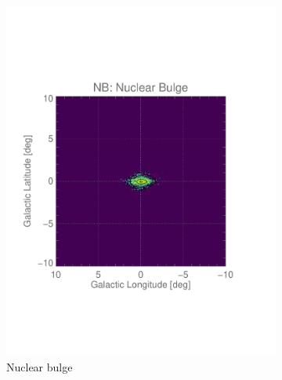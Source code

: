 \documentclass[doublespace,nopageskip]{VTthesis}
\begin{document}
\begin{figure}[htb]
\begin{subfigure}[h]{0.32\textwidth}
		\includegraphics[width=1\textwidth,trim=0.44in 2.03in 1.29in 2.34in,clip=true]{Figures/511keV/map_NB_log_grid_20x20.pdf}
		\caption{Nuclear bulge}
		\label{fig:nb_los}
	\end{subfigure}
	\begin{subfigure}[h]{0.32\textwidth}
		\centering

\end{subfigure}
\end{figure}
\end{document}
